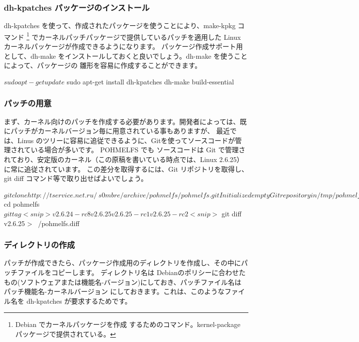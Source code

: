 \documentclass[mingoth,a4paper]{jsarticle}
\begin{document}
\subsubsection{dh-kpatches パッケージのインストール}
dh-kpatches を使って、作成されたパッケージを使うことにより、make-kpkg コマンド \footnote{Debian でカーネルパッケージを作成
するためのコマンド。kernel-package パッケージで提供されている。} 
でカーネルパッチパッケージで提供しているパッチを適用した Linux カーネルパッケージが作成できるようになります。
パッケージ作成サポート用として、dh-make をインストールしておくと良いでしょう。dh-make を使うことによって、パッケージの
雛形を容易に作成することができます。
\begin{commandline}
$ sudo apt-get update
$ sudo apt-get install dh-kpatches dh-make build-essential
\end{commandline}



\subsubsection{パッチの用意}
まず、カーネル向けのパッチを作成する必要があります。開発者によっては、既にパッチがカーネルバージョン毎に用意されている事もありますが、
最近では、Linus のツリーに容易に追従できるように、Gitを使ってソースコードが管理されている場合が多いです。
POHMELFS でも ソースコードは Git で管理されており、安定版のカーネル（この原稿を書いている時点では、Linux 2.6.25）に常に追従されています。
この差分を取得するには、Git リポジトリを取得し、git diff コマンド等で取り出せばよいでしょう。

\begin{commandline}
$ git clone http://tservice.net.ru/~s0mbre/archive/pohmelfs/pohmelfs.git
Initialized empty Git repository in /tmp/pohmelfs/.git/
got 37e1b82c0535386cf09b3821dff5e8cb5f9e26b4
walk 37e1b82c0535386cf09b3821dff5e8cb5f9e26b4
<snip>
$ cd pohmelfs
$ git tag
<snip>
v2.6.24-rc8
v2.6.25
v2.6.25-rc1
v2.6.25-rc2
<snip>
$ git diff v2.6.25 > ~/pohmelfs.diff
\end{commandline}

\subsubsection{ディレクトリの作成}

パッチが作成できたら、パッケージ作成用のディレクトリを作成し、その中にパッチファイルをコピーします。
ディレクトリ名は Debianのポリシーに合わせたもの(ソフトウェアまたは機能名-バージョン)にしておき、パッチファイル名は
パッチ機能名-カーネルバージョン にしておきます。これは、このようなファイル名を dh-kpatches が要求するためです。
\end{document}
